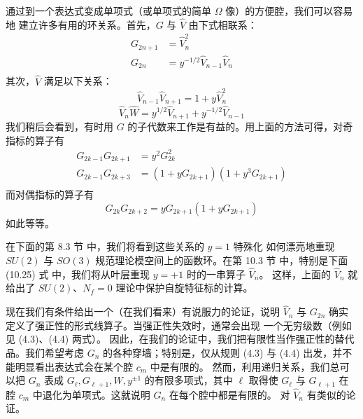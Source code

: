 通过到一个表达式变成单项式（或单项式的简单 $\Omega$ 像）的方便腔，我们可以容易地
建立许多有用的环关系。首先，$G$ 与 $\hat V$ 由下式相联系：
%
\begin{equation}\label{eq:SU2-formring-1}
\begin{split}
G_{2n+1} & = \hat V_n^2 \\
G_{2n} & = y^{-1/2}
\hat V_{n-1} \hat V_n \\
\end{split}
\end{equation}
%
其次，$\hat V$ 满足以下关系：
%
\begin{equation}\label{eq:SU2-formring-2}
\hat V_{n-1} \hat V_{n+1} = 1+ y \hat V_n^2
\end{equation}
%
%
\begin{equation}\label{eq:SU2-formring-3}
  \hat V_{n} \hat W =  y^{1/2} \hat V_{n+1} + y^{-1/2} \hat V_{n-1}
\end{equation}
%
我们稍后会看到，有时用 $G$ 的子代数来工作是有益的。用上面的方法可得，对奇指标的算子有
%
\begin{equation}\label{eq:SU2-formring-4}
\begin{split}
G_{2k-1} G_{2k+1} & = y^2 G_{2k}^2 \\
G_{2k-1} G_{2k+3} & = (1+ y G_{2k+1})(1+y^3 G_{2k+1}) \\
\end{split}
\end{equation}
%
而对偶指标的算子有
%
\begin{equation}\label{eq:SU2-formring-5}
G_{2k} G_{2k+2} = y G_{2k+1} (1+ y G_{2k+1})
\end{equation}
%
如此等等。

在下面的第 8.3 节%
中，我们将看到这些关系的 $y=1$ 特殊化
如何漂亮地重现 $SU(2)$ 与 $SO(3)$ 规范理论模空间上的函数环。在第 10.3 节%
中，特别是下面 (10.25) 式%
中，我们将从叶层重现
$y=+1$ 时的一串算子 $\hat V_n$。
这样，上面的 $\hat V_n$ 就给出了 $SU(2)$、$N_f=0$ 理论中保护自旋特征标的计算。

现在我们有条件给出一个（在我们看来）有说服力的论证，说明 $\hat V_n$ 与 $G_{2n}$
确实定义了强正性的形式线算子。当强正性失效时，通常会出现
一个无穷级数（例如见 (4.3)、(4.4) 两式）。%
因此，在我们的论证中，我们把有限性当作强正性的替代品。我们希望考虑
$G_n$ 的各种穿墙；特别是，仅从规则 (4.3) 与 (4.4) 出发，并不能明显看出表达式会在某个腔 $c_m$ 中是有限的。%
然而，利用递归关系，我们总可以把 $G_n$ 表成
$G_\ell, G_{\ell+1}, W, y^{\pm 1}$ 的有限多项式，其中 $\ell$ 取得使 $G_{\ell}$ 与 $G_{\ell+1}$
在腔 $c_m$ 中退化为单项式。这就说明 $G_n$ 在每个腔中都是有限的。
对 $\hat V_n$ 有类似的论证。

